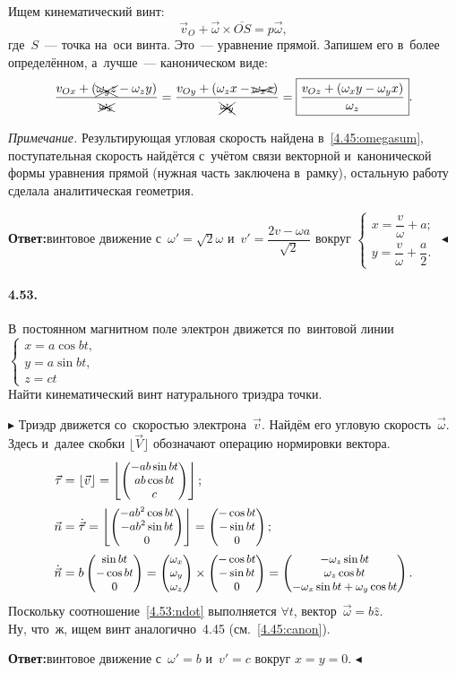 \documentclass{weekly}
\begin{document}
Ищем кинематический винт:
\begin{equation}
    \vec v_O + \vec\omega \times \overline{OS} = p\vec\omega,
\end{equation}
где~$S$~--- точка на~оси винта. Это~--- уравнение прямой.
Запишем его в~более определённом, а~лучше~--- каноническом виде:
\begin{equation}
    \frac{v_{Ox} + \left(\xcancel{\omega_y z} - \omega_z y\right)}
        {\xcancel{\omega_x}} =
    \frac{v_{Oy} + \left(\omega_z x - \xcancel{\omega_x z}\right)}
        {\xcancel{\omega_y}} =
    \boxed{\frac{v_{Oz} + \left(\omega_x y - \omega_y x\right)}
        {\omega_z}}. \label{4.45:canon}
\end{equation}

\textsl{Примечание.} Результирующая угловая скорость найдена
в~\eqref{4.45:omegasum}, поступательная скорость найдётся
с~учётом связи векторной и~канонической формы уравнения прямой
(нужная часть заключена в~рамку), остальную работу сделала
аналитическая геометрия.

\textbf{Ответ:}\quad винтовое движение с~$\omega' = \sqrt{2}\omega$
и~$v' = \dfrac{2v - \omega a}{\sqrt{2}}$ вокруг
$
\begin{cases}
    x = \dfrac{v}{\omega} + a; \\[2ex]
    y = \dfrac{v}{\omega} + \dfrac{a}{2}.
\end{cases}
$
\hfill $\blacktriangleleft$


\paragraph{4.53.} В~постоянном магнитном поле электрон движется
по~винтовой линии {\footnotesize
$
\begin{cases}
    x = a \cos bt, \\
    y = a \sin bt, \\
    z = ct
\end{cases}
$}\\[-2.5ex]
Найти кинематический винт натурального триэдра точки.

$\blacktriangleright$ Триэдр движется со~скоростью электрона~$\vec v$.
Найдём его угловую скорость~$\vec\omega$.
Здесь и~далее скобки $\lfloor \vec V \rfloor$ обозначают
операцию нормировки вектора.
\begin{align}
    \vec\tau &= \lfloor\vec v\rfloor
        = \left\lfloor \small\begin{pmatrix}-ab \sin bt\\ab \cos bt\\c\end{pmatrix} \right\rfloor;\\
    \vec n &= \dot{\vec\tau}
        = \left\lfloor \small\begin{pmatrix}-ab^2 \cos bt\\-ab^2 \sin bt\\0\end{pmatrix}\right\rfloor
        = \small\begin{pmatrix}-\cos bt\\-\sin bt\\0\end{pmatrix}; \\
    \dot{\vec n} &= b \small\begin{pmatrix}\sin bt\\-\cos bt\\0\end{pmatrix}
        = \small\begin{pmatrix}\omega_x\\\omega_y\\\omega_z\end{pmatrix} \times
            \small\begin{pmatrix}-\cos bt\\-\sin bt\\0\end{pmatrix}
        = \small\begin{pmatrix}-\omega_z \sin bt\\\omega_z \cos bt\\-\omega_x \sin bt + \omega_y \cos bt\end{pmatrix}. \label{4.53:ndot}
\end{align}
Поскольку соотношение~\eqref{4.53:ndot} выполняется $\forall t$,
вектор~$\vec\omega = b \hat z$.\\
Ну, что~ж, ищем винт аналогично~4.45 (см.~\eqref{4.45:canon}).

\textbf{Ответ:}\quad винтовое движение с~$\omega' = b$
и~$v' = c$ вокруг $x = y = 0$.
\hfill $\blacktriangleleft$
\end{document}
